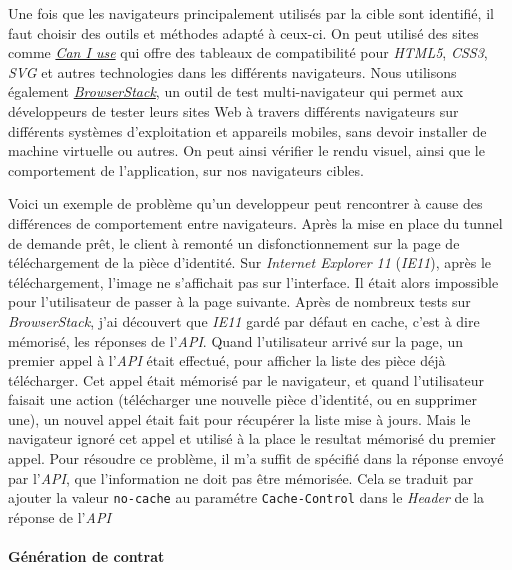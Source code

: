 \documentclass[12pt,a4paper]{article}
\begin{document}
  \bigskip

  Une fois que les navigateurs principalement utilisés par la cible sont
  identifié, il faut choisir des outils et méthodes adapté à ceux-ci. On
  peut utilisé des sites comme \href{http://caniuse.com/}{\emph{Can I
  use}} qui offre des tableaux de compatibilité pour \emph{HTML5},
  \emph{CSS3}, \emph{SVG} et autres technologies dans les différents
  navigateurs. Nous utilisons également
  \href{https://www.browserstack.com/}{\emph{BrowserStack}}, un outil de
  test multi-navigateur qui permet aux développeurs de tester leurs sites
  Web à travers différents navigateurs sur différents systèmes
  d'exploitation et appareils mobiles, sans devoir installer de machine
  virtuelle ou autres. On peut ainsi vérifier le rendu visuel, ainsi que
  le comportement de l'application, sur nos navigateurs cibles.

  \bigskip

  Voici un exemple de problème qu'un developpeur peut rencontrer à cause
  des différences de comportement entre navigateurs. Après la mise en
  place du tunnel de demande prêt, le client à remonté un
  disfonctionnement sur la page de téléchargement de la pièce d'identité.
  Sur \emph{Internet Explorer 11} (\emph{IE11}), après le téléchargement,
  l'image ne s'affichait pas sur l'interface. Il était alors impossible
  pour l'utilisateur de passer à la page suivante. Après de nombreux tests
  sur \emph{BrowserStack}, j'ai découvert que \emph{IE11} gardé par défaut
  en cache, c'est à dire mémorisé, les réponses de l'\emph{API}. Quand
  l'utilisateur arrivé sur la page, un premier appel à l'\emph{API} était
  effectué, pour afficher la liste des pièce déjà télécharger. Cet appel
  était mémorisé par le navigateur, et quand l'utilisateur faisait une
  action (télécharger une nouvelle pièce d'identité, ou en supprimer une),
  un nouvel appel était fait pour récupérer la liste mise à jours. Mais le
  navigateur ignoré cet appel et utilisé à la place le resultat mémorisé
  du premier appel. Pour résoudre ce problème, il m'a suffit de spécifié
  dans la réponse envoyé par l'\emph{API}, que l'information ne doit pas
  être mémorisée. Cela se traduit par ajouter la valeur \texttt{no-cache}
  au paramétre \texttt{Cache-Control} dans le \emph{Header} de la réponse
  de l'\emph{API}

  \bigskip

  \paragraph{Génération de contrat}\label{guxe9nuxe9ration-de-contrat}
\end{document}
